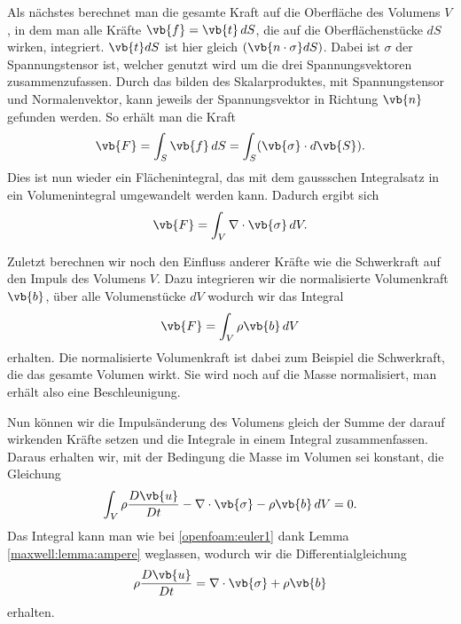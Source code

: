 Als nächstes berechnet man die gesamte Kraft auf die Oberfläche des Volumens $V$, in dem man alle Kräfte $\vb{f} = \vb{t}\,dS$, die auf die Oberflächenstücke $dS$ wirken, integriert.
$\vb{t} dS$ ist hier gleich $(\vb{n\cdot\sigma}dS)$.
Dabei ist $\sigma$ der Spannungstensor ist, welcher genutzt wird um die drei Spannungsvektoren zusammenzufassen.
Durch das bilden des Skalarproduktes, mit Spannungstensor und Normalenvektor, kann jeweils der Spannungsvektor in Richtung $\vb{n}$ gefunden werden.
So erhält man die Kraft 
\[\vb{F} 
=
\int_{S}\vb{f}\, dS
= \int_{S} (\vb{\sigma}\cdot d\vb{S})
.\]
Dies ist nun wieder ein Flächenintegral, das mit dem gaussschen Integralsatz in ein Volumenintegral umgewandelt werden kann.
Dadurch ergibt sich
\[\vb{F} 
=
\int_{V}\nabla \cdot \vb{\sigma}\, dV
.\]

Zuletzt berechnen wir noch den Einfluss anderer Kräfte wie die Schwerkraft auf den Impuls des Volumens $V$.
Dazu integrieren wir die normalisierte Volumenkraft $\vb{b}$, über alle Volumenstücke $dV$ wodurch wir das Integral 
\[\vb{F} 
=
\int_{V}\rho\vb{b}\, dV
\]
erhalten.
Die normalisierte Volumenkraft ist dabei zum Beispiel die Schwerkraft, die das gesamte Volumen wirkt. 
Sie wird noch auf die Masse normalisiert, man erhält also eine Beschleunigung.

Nun können wir die Impulsänderung des Volumens gleich der Summe der darauf wirkenden Kräfte setzen und die Integrale in einem Integral zusammenfassen. Daraus erhalten wir, mit der Bedingung die Masse im Volumen sei konstant, die Gleichung 
\[\int_{V} \rho \frac{D\vb{u}}{Dt} - \nabla \cdot \vb{\sigma} -\rho \vb{b}\, dV
=
0.
\]
Das Integral kann man wie bei \ref{openfoam:euler1} dank Lemma \ref{maxwell:lemma:ampere} weglassen, wodurch wir die Differentialgleichung
\begin{equation}
\label{openfoam:euler2_1}
\rho \frac{D\vb{u}}{Dt}
= 
\nabla \cdot \vb{\sigma} +\rho \vb{b}
\end{equation}
erhalten.

